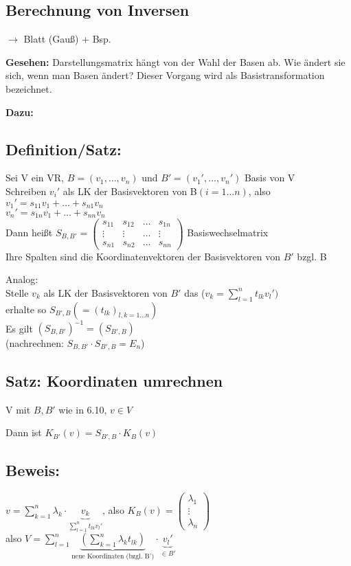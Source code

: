 \subsection{Berechnung von Inversen}
$\rightarrow$ Blatt (Gauß) + Bsp.

\textbf{Gesehen:} Darstellungsmatrix hängt von der Wahl der Basen ab. Wie ändert sie sich, wenn man Basen ändert? Dieser Vorgang wird als Basistransformation bezeichnet.

\textbf{Dazu:}
\subsection{Definition/Satz:}
Sei V ein VR, $B=(v_1,\dots,v_n)$ und $B'=(v_1',\dots,v_n')$ Basis von V\\
Schreiben $v_i'$ als LK der Basisvektoren von B$(i=1\dots n)$, also\\
$v_1'=s_{11}v_1+\dots+s_{n1}v_n$\\
$v_n'=s_{1n}v_1+\dots+s_{nn}v_n$\\
Dann heißt $S_{B,B'}=\begin{pmatrix}s_{11} & s_{12} & \dots & s_{1n} \\ \vdots & \vdots & \dots & \vdots \\ s_{n1} & s_{n2} & \dots & s_{nn}\end{pmatrix}$ Basiswechselmatrix\\
Ihre Spalten sind die Koordinatenvektoren der Basisvektoren von $B'$ bzgl. B

Analog:\\
Stelle $v_k$ als LK der Basisvektoren von $B'$ das ($v_k=\sum_{l=1}^n t_{lk}v_l')$\\
erhalte so $S_{B',B} (=(t_{lk})_{l,k=1\dots n})$\\
Es gilt $(S_{B,B'})^{-1}=(S_{B',B})$\\
(nachrechnen: $S_{B,B'}\cdot S_{B',B}=E_n$)

\subsection{Satz: Koordinaten umrechnen}
V mit $B,B'$ wie in 6.10, $v\in V$

Dann ist $K_{B'} (v)=S_{B',B}\cdot K_B(v)$

\subsection*{Beweis:} $v=\sum_{k=1}^n \lambda_k\cdot \underbrace{v_k}_{\sum_{l=1}^n t_{lk}v_l'}$, also $K_B(v)=\begin{pmatrix}\lambda_1 \\ \vdots \\ \lambda_n\end{pmatrix}$\\
also $V=\sum_{l=1}^n\underbrace{\left(\sum_{k=1}^n \lambda_k t_{lk}\right)}_{\text{neue Koordinaten (bzgl. B')}}\cdot \underbrace{v_l'}_{\in B'}$

